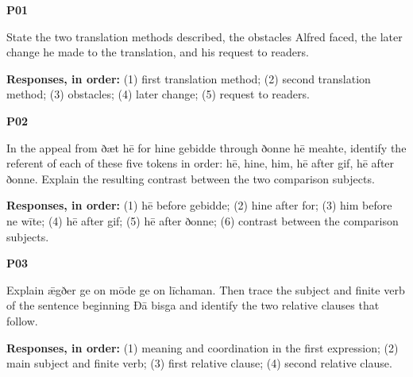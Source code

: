 \par\begin{minipage}{\linewidth}\raggedright
\textbf{P01}

State the two translation methods described, the obstacles Alfred faced, the later change he made to the translation, and his request to readers.

\textbf{Responses, in order:} (1) first translation method; (2) second translation method; (3) obstacles; (4) later change; (5) request to readers.

\end{minipage}\par\addvspace{4pt}

\par\begin{minipage}{\linewidth}\raggedright
\textbf{P02}

In the appeal from ðæt hē for hine gebidde through ðonne hē meahte, identify the referent of each of these five tokens in order: hē, hine, him, hē after gif, hē after ðonne. Explain the resulting contrast between the two comparison subjects.

\textbf{Responses, in order:} (1) hē before gebidde; (2) hine after for; (3) him before ne wīte; (4) hē after gif; (5) hē after ðonne; (6) contrast between the comparison subjects.

\end{minipage}\par\addvspace{4pt}

\par\begin{minipage}{\linewidth}\raggedright
\textbf{P03}

Explain ǣgðer ge on mōde ge on līchaman. Then trace the subject and finite verb of the sentence beginning Ðā bisga and identify the two relative clauses that follow.

\textbf{Responses, in order:} (1) meaning and coordination in the first expression; (2) main subject and finite verb; (3) first relative clause; (4) second relative clause.

\end{minipage}\par\addvspace{4pt}

